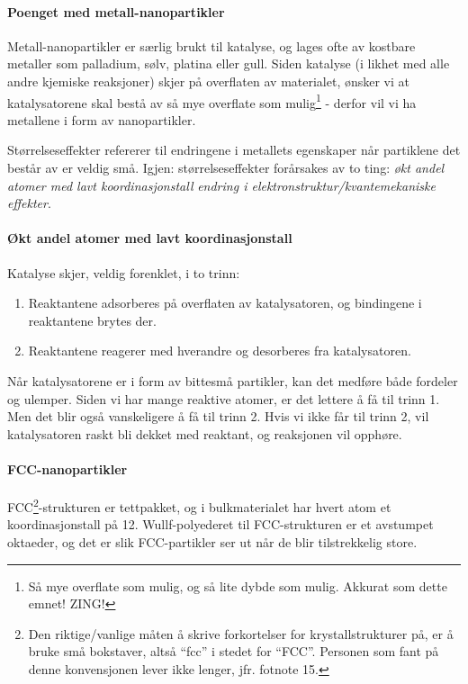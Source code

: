 \paragraph{Poenget med metall-nanopartikler} Metall-nanopartikler er særlig brukt til katalyse, og lages ofte av kostbare metaller som palladium, sølv, platina eller gull. Siden katalyse (i likhet med alle andre kjemiske reaksjoner) skjer på overflaten av materialet, ønsker vi at katalysatorene skal bestå av så mye overflate som mulig\footnote{Så mye overflate som mulig, og så lite dybde som mulig. Akkurat som dette emnet! ZING!} - derfor vil vi ha metallene i form av nanopartikler.

Størrelseseffekter refererer til endringene i metallets egenskaper når partiklene det består av er veldig små. Igjen: størrelseseffekter forårsakes av to ting:  \emph{økt andel atomer med lavt koordinasjonstall} \emph{endring i elektronstruktur/kvantemekaniske effekter}.

\paragraph{Økt andel atomer med lavt koordinasjonstall} Katalyse skjer, veldig forenklet, i to trinn:
\begin{enumerate}
	\item Reaktantene adsorberes på overflaten av katalysatoren, og bindingene i reaktantene brytes der.
	\item Reaktantene reagerer med hverandre og desorberes fra katalysatoren.
\end{enumerate}
Når katalysatorene er i form av bittesmå partikler, kan det medføre både fordeler og ulemper. Siden vi har mange reaktive atomer, er det lettere å få til trinn 1. Men det blir også vanskeligere å få til trinn 2. Hvis vi ikke får til trinn 2, vil katalysatoren raskt bli dekket med reaktant, og reaksjonen vil opphøre.

\paragraph{FCC-nanopartikler} FCC\footnote{Den riktige/vanlige måten å skrive forkortelser for krystallstrukturer på, er å bruke små bokstaver, altså ``fcc'' i stedet for ``FCC''. Personen som fant på denne konvensjonen lever ikke lenger, jfr. fotnote 15.}-strukturen er tettpakket, og i bulkmaterialet har hvert atom et koordinasjonstall på 12. Wullf-polyederet til FCC-strukturen er et avstumpet oktaeder, og det er slik FCC-partikler ser ut når de blir tilstrekkelig store.

